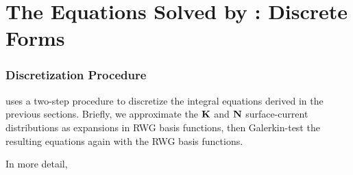 \newpage
\section{The Equations Solved by \ls: Discrete Forms}

\subsubsection*{Discretization Procedure} 

\lss uses a two-step procedure to discretize the integral equations 
derived in the previous sections. 
Briefly, we approximate the $\mathbf{K}$ and $\mathbf{N}$ surface-current 
distributions as expansions in RWG basis functions, then 
Galerkin-test the resulting equations again with the RWG basis
functions. 

In more detail,

